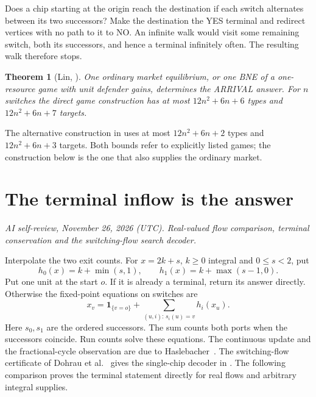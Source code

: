 \documentclass[11pt,oneside,openany,notitlepage]{report}
\newtheorem{theorem}{Theorem}[chapter]
\newcommand{\reviewdate}{November 26, 2026 (UTC)}
\newcommand{\reviewmark}[1]{\par\nopagebreak[4]\noindent
  {\footnotesize\itshape AI self-review, \reviewdate. #1\par}\nobreak\smallskip}
\begin{document}
Does a chip starting at the origin reach the destination if each switch
alternates between its two successors? Make the destination the YES
terminal and redirect vertices with no path to it to NO. An infinite
walk would visit some remaining switch, both its successors, and hence
a terminal infinitely often. The resulting walk therefore stops.

\begin{theorem}[Lin, {\cite[Theorems~4.1 and~4.11]{book}}]\label{thm:arrival}
One ordinary market equilibrium, or one BNE of a one-resource game with
unit defender gains, determines the ARRIVAL answer. For \(n\) switches
the direct game construction has at most \(12n^2+6n+6\) types and
\(12n^2+6n+7\) targets.
\end{theorem}

The alternative construction in \cite[Appendix~C, Theorem~C.1]{book}
uses at most \(12n^2+6n+2\) types and \(12n^2+6n+3\) targets. Both bounds
refer to explicitly listed games; the construction below is the one that
also supplies the ordinary market.

\section{The terminal inflow is the answer}
\reviewmark{Real-valued flow comparison, terminal conservation and the switching-flow search decoder.}

Interpolate the two exit counts. For \(x=2k+s\), \(k\ge0\) integral
and \(0\le s<2\), put
\[
 h_0(x)=k+\min(s,1),\qquad h_1(x)=k+\max(s-1,0).
\]
Put one unit at the start \(o\). If it is already a terminal, return
its answer directly. Otherwise the fixed-point equations on switches are
\[
 x_v=\mathbf{1}_{\{v=o\}}+
      \sum_{(u,i):\,s_i(u)=v}h_i(x_u).
\]
Here \(s_0,s_1\) are the ordered successors. The sum counts both ports
when the successors coincide. Run counts solve these equations. The
continuous update and the fractional-cycle observation are due to
Haslebacher~\cite[Lemma~14]{has}. The switching-flow certificate of
Dohrau et al.~\cite[Lemma~1]{arrival} gives the single-chip decoder in
\cite[Chapter~4]{book}. The following comparison proves the terminal
statement directly for real flows and arbitrary integral supplies.
\end{document}
